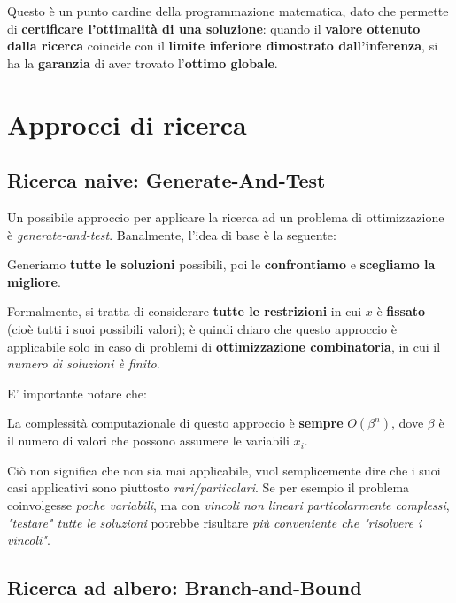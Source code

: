 Questo è un punto cardine della programmazione matematica, dato che permette di 
\textbf{certificare l'ottimalità di una soluzione}: quando il \textbf{valore ottenuto dalla ricerca} 
coincide con il \textbf{limite inferiore dimostrato dall'inferenza}, si ha la \textbf{garanzia} di aver 
trovato l'\textbf{ottimo globale}.

\section{Approcci di ricerca}

\subsection{Ricerca naive: Generate-And-Test}

Un possibile approccio per applicare la ricerca ad un problema di ottimizzazione
è \textit{generate-and-test}. Banalmente, l'idea di base è la seguente:

\begin{definition}
    Generiamo \textbf{tutte le soluzioni} possibili, poi le \textbf{confrontiamo}
    e \textbf{scegliamo la migliore}.
\end{definition}

Formalmente, si tratta di considerare \textbf{tutte le restrizioni} in cui
$x$ è \textbf{fissato} (cioè tutti i suoi possibili valori); è quindi chiaro
che questo approccio è applicabile solo in caso di problemi di \textbf{ottimizzazione
combinatoria}, in cui il \textit{numero di soluzioni è finito}.

E' importante notare che:

\begin{warn}
    La complessità computazionale di questo approccio è \textbf{sempre} 
    $O(\beta^n)$, dove $\beta$ è il numero di valori che possono
    assumere le variabili $x_i$.
\end{warn}

Ciò non significa che non sia mai applicabile, vuol semplicemente dire che
i suoi casi applicativi sono piuttosto \textit{rari/particolari}. Se per esempio
il problema coinvolgesse \textit{poche variabili}, ma con \textit{vincoli non lineari
particolarmente complessi}, \textit{"testare" tutte le soluzioni} potrebbe 
risultare \textit{più conveniente che "risolvere i vincoli"}.

\subsection{Ricerca ad albero: Branch-and-Bound}

